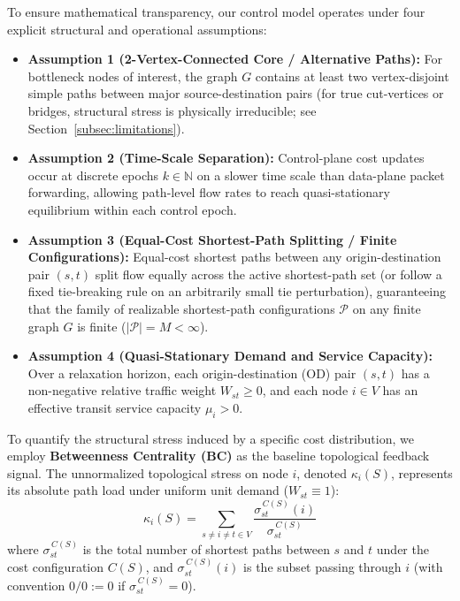 \documentclass[journal]{IEEEtran}
\theoremstyle{plain}
\theoremstyle{definition}
\newcommand{\rev}[1]{{\color{blue}#1}}
\begin{document}
\rev{To ensure mathematical transparency, our control model operates under four explicit structural and operational assumptions:
\begin{itemize}
    \item \textbf{Assumption 1 (2-Vertex-Connected Core / Alternative Paths):} For bottleneck nodes of interest, the graph $G$ contains at least two vertex-disjoint simple paths between major source-destination pairs (for true cut-vertices or bridges, structural stress is physically irreducible; see Section~\ref{subsec:limitations}).
    \item \textbf{Assumption 2 (Time-Scale Separation):} Control-plane cost updates occur at discrete epochs $k \in \mathbb{N}$ on a slower time scale than data-plane packet forwarding, allowing path-level flow rates to reach quasi-stationary equilibrium within each control epoch.
    \item \textbf{Assumption 3 (Equal-Cost Shortest-Path Splitting / Finite Configurations):} Equal-cost shortest paths between any origin-destination pair $(s,t)$ split flow equally across the active shortest-path set (or follow a fixed tie-breaking rule on an arbitrarily small tie perturbation), guaranteeing that the family of realizable shortest-path configurations $\mathcal{P}$ on any finite graph $G$ is finite ($|\mathcal{P}| = M < \infty$).
    \item \textbf{Assumption 4 (Quasi-Stationary Demand and Service Capacity):} Over a relaxation horizon, each origin-destination (OD) pair $(s,t)$ has a non-negative relative traffic weight $W_{st} \ge 0$, and each node $i \in V$ has an effective transit service capacity $\mu_i > 0$.
\end{itemize}}

To quantify the structural stress induced by a specific cost distribution, we employ \textbf{Betweenness Centrality (BC)} \cite{Brandes2001Faster} as the baseline topological feedback signal. 
The unnormalized topological stress on node $i$, denoted $\kappa_i(S)$, represents its absolute path load under uniform unit demand ($W_{st} \equiv 1$):
\begin{equation}
    \label{eq:bc_definition}
    \kappa_i(S) = \sum_{s\neq i\neq t\in V} \frac{\sigma^{\,C(S)}_{st}(i)}{\sigma^{\,C(S)}_{st}}
\end{equation}
where $\sigma^{\,C(S)}_{st}$ is the total number of shortest paths between $s$ and $t$ under the cost configuration $C(S)$, and $\sigma^{\,C(S)}_{st}(i)$ is the subset passing through $i$ \rev{(with convention $0/0 := 0$ if $\sigma^{\,C(S)}_{st} = 0$)}.
\end{document}
